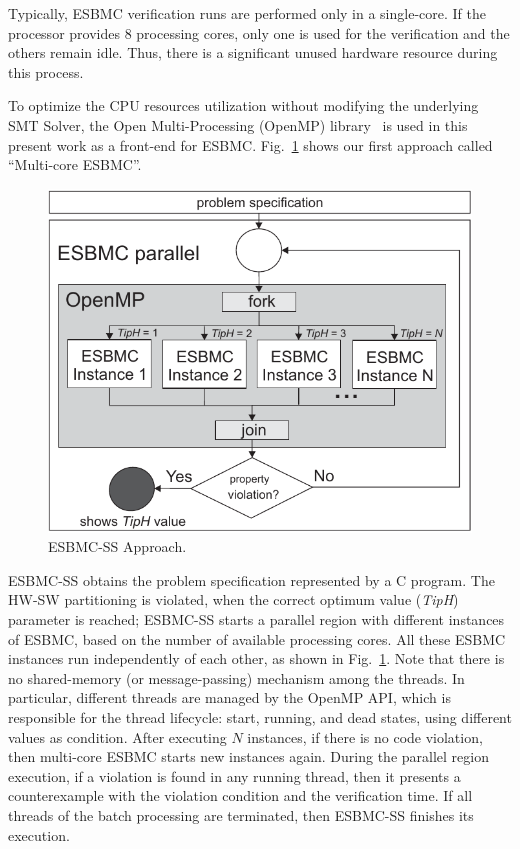 Typically, ESBMC verification runs are performed only in a single-core. If the processor provides $8$ processing cores, only one is used for the verification and the others remain idle. Thus, there is a significant unused hardware resource during this process. 


To optimize the CPU resources utilization without modifying the underlying SMT Solver, the Open Multi-Processing (OpenMP) library~\cite{Dagum1998} is used in this present work as a front-end for ESBMC. Fig.~\ref{ESBMC-Multi-core} shows our first approach called ``Multi-core ESBMC''.
%
\begin{figure}[ht]
	\centering
  \includegraphics[scale=0.75]{Image/esbmc-parallel.pdf} 
	\caption{ESBMC-SS Approach.}
	\label{ESBMC-Multi-core}
\end{figure}

ESBMC-SS obtains the problem specification represented by a C program. The HW-SW partitioning is violated, when the correct optimum value (\textit{TipH}) parameter is reached; ESBMC-SS starts a parallel region with different instances of ESBMC, based on the number of available processing cores. All these ESBMC instances run independently of each other, as shown in Fig.~\ref{ESBMC-Multi-core}. Note that there is no shared-memory (or message-passing) mechanism among the threads. In particular, different threads are managed by the OpenMP API, which is responsible for the thread lifecycle: start, running, and dead states, using different values as condition. After executing $N$ instances, if there is no code violation, then multi-core ESBMC starts new instances again. During the parallel region execution, if a violation is found in any running thread, then it presents a counterexample with the violation condition and the verification time. If all threads of the batch processing are terminated, then ESBMC-SS finishes its execution.

